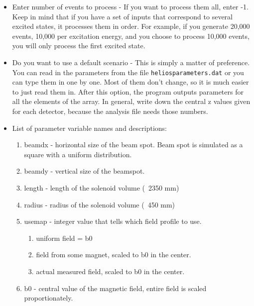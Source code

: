 \begin{singlespace}
\begin{itemize}
	\setlength{\itemsep}{0pt}
  \setlength{\parskip}{0pt}
  \setlength{\parsep}{0pt}
	\item \textsf{Enter number of events to process} - If you want to process them all, enter -1. Keep in mind that if you have a set of inputs that correspond to several excited states, it processes them in order. For example, if you generate 20,000 events, 10,000 per excitation energy, and you choose to process 10,000 events, you will only process the first excited state.
	\item \textsf{Do you want to use a default scenario} -  This is simply a matter of preference. You can read in the parameters from the file \texttt{heliosparameters.dat} or you can type them in one by one. Most of them don't change, so it is much easier to just read them in. After this option, the program outputs parameters for all the elements of the array. In general, write down the central z values given for each detector, because the analysis file needs those numbers.
	\item List of parameter variable names and descriptions:
		\begin{enumerate}
		\setlength{\itemsep}{0pt}
  	\setlength{\parskip}{0pt}
  	\setlength{\parsep}{0pt}
		\addtocounter{enumi}{-1}	
			\item \textsf{beamdx} - horizontal size of the beam spot. Beam spot is simulated as a square with a uniform distribution.
			\item \textsf{beamdy} - vertical size of the beamspot.
			\item \textsf{length} - length of the solenoid volume (~2350 mm)
			\item \textsf{radius} - radius of the solenoid volume (~450 mm)
			\item \textsf{usemap} - integer value that tells which field profile to use.
				\begin{enumerate}
					\setlength{\itemsep}{0pt}
  				\setlength{\parskip}{0pt}
  				\setlength{\parsep}{0pt}
					\item uniform field = b0
					\item field from some magnet, scaled to b0 in the center.
					\item actual measured field, scaled to b0 in the center.
				\end{enumerate}
			\item \textsf{b0} - central value of the magnetic field, entire field is scaled proportionately. 

\end{enumerate}
\end{itemize}
\end{singlespace}
